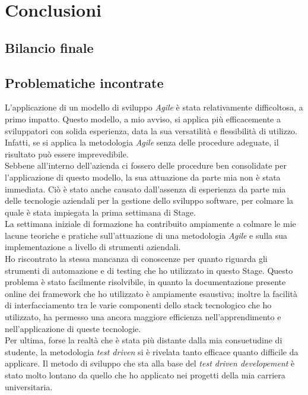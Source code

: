 
\chapter{Conclusioni}
\label{cap:conclusioni}

\section{Bilancio finale}

\section{Problematiche incontrate}
L'applicazione di un modello di sviluppo \emph{Agile} è stata relativamente difficoltosa, a primo impatto. Questo modello, a mio avviso, si applica più efficacemente a sviluppatori con solida esperienza, data la sua versatilità e flessibilità di utilizzo. Infatti, se si applica la metodologia \emph{Agile} senza delle procedure adeguate, il risultato può essere imprevedibile.\\
Sebbene all'interno dell'azienda ci fossero delle procedure ben consolidate per l'applicazione di questo modello, la sua attuazione da parte mia non è stata immediata. Ciò è stato anche causato dall'assenza di esperienza da parte mia delle tecnologie aziendali per la gestione dello sviluppo software, per colmare la quale è stata impiegata la prima settimana di Stage.\\
La settimana iniziale di formazione ha contribuito ampiamente a colmare le mie lacune teoriche e pratiche sull'attuazione di una metodologia \emph{Agile} e sulla sua implementazione a livello di strumenti aziendali.\\
Ho riscontrato la stessa mancanza di conoscenze per quanto riguarda gli strumenti di automazione e di testing che ho utilizzato in questo Stage. Questo problema è stato facilmente risolvibile, in quanto la documentazione presente online dei framework che ho utilizzato è ampiamente esaustiva; inoltre la facilità di interfacciamento tra le varie componenti dello stack tecnologico che ho utilizzato, ha permesso una ancora maggiore efficienza nell'apprendimento e nell'applicazione di queste tecnologie.\\
Per ultima, forse la realtà che è stata più distante dalla mia consuetudine di studente, la metodologia \emph{test driven} si è rivelata tanto efficace quanto difficile da applicare. Il metodo di sviluppo che sta alla base del \emph{test driven developement} è stato molto lontano da quello che ho applicato nei progetti della mia carriera universitaria.

